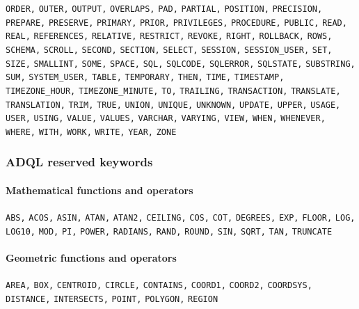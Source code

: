 \documentclass[11pt,a4paper]{ivoa}
\begin{document}
\begin{raggedright}
\texttt{ORDER,} \texttt{OUTER,} \texttt{OUTPUT,} \texttt{OVERLAPS,}
\texttt{PAD,} \texttt{PARTIAL,} \texttt{POSITION,}
\texttt{PRECISION,} \texttt{PREPARE,} \texttt{PRESERVE,}
\texttt{PRIMARY,} \texttt{PRIOR,} \texttt{PRIVILEGES,}
\texttt{PROCEDURE,} \texttt{PUBLIC,} \texttt{READ,} \texttt{REAL,}
\texttt{REFERENCES,} \texttt{RELATIVE,} \texttt{RESTRICT,}
\texttt{REVOKE,} \texttt{RIGHT,} \texttt{ROLLBACK,} \texttt{ROWS,}
\texttt{SCHEMA,} \texttt{SCROLL,} \texttt{SECOND,} \texttt{SECTION,}
\texttt{SELECT,} \texttt{SESSION,} \texttt{SESSION\_USER,}
\texttt{SET,} \texttt{SIZE,} \texttt{SMALLINT,} \texttt{SOME,}
\texttt{SPACE,} \texttt{SQL,} \texttt{SQLCODE,} \texttt{SQLERROR,}
\texttt{SQLSTATE,} \texttt{SUBSTRING,} \texttt{SUM,}
\texttt{SYSTEM\_USER,} \texttt{TABLE,} \texttt{TEMPORARY,}
\texttt{THEN,} \texttt{TIME,} \texttt{TIMESTAMP,}
\texttt{TIMEZONE\_HOUR,} \texttt{TIMEZONE\_MINUTE,} \texttt{TO,}
\texttt{TRAILING,} \texttt{TRANSACTION,} \texttt{TRANSLATE,}
\texttt{TRANSLATION,} \texttt{TRIM,} \texttt{TRUE,} \texttt{UNION,}
\texttt{UNIQUE,} \texttt{UNKNOWN,} \texttt{UPDATE,} \texttt{UPPER,}
\texttt{USAGE,} \texttt{USER,} \texttt{USING,} \texttt{VALUE,}
\texttt{VALUES,} \texttt{VARCHAR,} \texttt{VARYING,} \texttt{VIEW,}
\texttt{WHEN,} \texttt{WHENEVER,} \texttt{WHERE,} \texttt{WITH,}
\texttt{WORK,} \texttt{WRITE,} \texttt{YEAR,} \texttt{ZONE}
\end{raggedright}

\subsubsection{ADQL reserved keywords}
\label{sec:adql.reswords}


\begin{raggedright}
\paragraph{Mathematical functions and operators}
\texttt{ABS,} \texttt{ACOS,} \texttt{ASIN,} \texttt{ATAN,}
\texttt{ATAN2,} \texttt{CEILING,} \texttt{COS,} \texttt{COT,}
\texttt{DEGREES,} \texttt{EXP,} \texttt{FLOOR,} \texttt{LOG,}
\texttt{LOG10,} \texttt{MOD,}  \texttt{PI,} \texttt{POWER,}
\texttt{RADIANS,} \texttt{RAND,} \texttt{ROUND,} \texttt{SIN,}
\texttt{SQRT,} \texttt{TAN,} \texttt{TRUNCATE}
\end{raggedright}


\begin{raggedright}
\paragraph{Geometric functions and operators}
\texttt{AREA,} \texttt{BOX,} \texttt{CENTROID,} \texttt{CIRCLE,}
\texttt{CONTAINS,} \texttt{COORD1,} \texttt{COORD2,}
\texttt{COORDSYS,} \texttt{DISTANCE,} \texttt{INTERSECTS,}
\texttt{POINT,} \texttt{POLYGON,} \texttt{REGION}
\end{raggedright}
\end{document}
